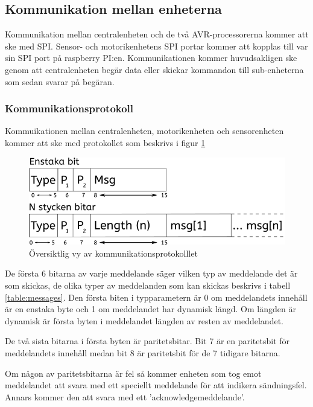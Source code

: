 \documentclass[a4paper,titlepage,12pt]{article}
\begin{document}
	\subsection{Kommunikation mellan enheterna}
	Kommunikation mellan centralenheten och de två AVR-processorerna kommer att ske
	med SPI. Sensor- och motorikenhetens SPI portar kommer att kopplas till var sin
	SPI port på raspberry PI:en. Kommunikationen kommer huvudsakligen ske genom  att
	centralenheten begär data eller skickar kommandon till sub-enheterna som
	sedan svarar på begäran.  

	\subsubsection{Kommunikationsprotokoll}
	\label{ssub:Kommunikationsprotokoll}
	Kommuikationen mellan centralenheten, motorikenheten och sensorenheten kommer att ske 
	med protokollet som beskrivs i figur \ref{fig:kommunikation1}

	\begin{figure}[h]
		\centering
		\includegraphics[width=0.5\linewidth]{images/communication_protocol1.png}
		\caption{Översiktlig vy av kommunikationsprotokolllet}
		\label{fig:kommunikation1}
	\end{figure}

	De första 6 bitarna av varje meddelande säger vilken typ av meddelande det är som
	skickas, de olika typer av meddelanden som kan skickas beskrivs i tabell 
	\ref{table:messages}. Den första biten i typparametern är 0 om meddelandets
	innehåll är en enstaka byte och 1 om meddelandet har dynamisk längd. Om längden
	är dynamisk är första byten i meddelandet längden av resten av meddelandet.

	De två sista bitarna i första byten är paritetsbitar. Bit 7 är en  paritetsbit
	för meddelandets innehåll medan bit 8 är paritetsbit för de 7 tidigare bitarna.

	Om någon av paritetsbitarna är fel så kommer enheten som tog emot meddelandet att svara
	med ett speciellt meddelande för att indikera sändningsfel. Annars kommer den 
	att svara med ett 'acknowledgemeddelande'.
\end{document}
